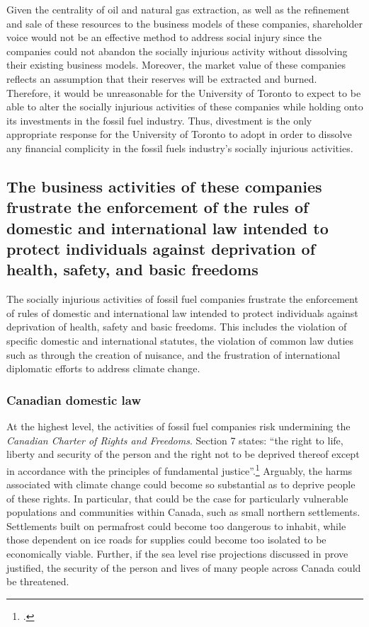 Given the centrality of oil and natural gas extraction, as well as the refinement and sale of these resources to the business models of these companies, shareholder voice would not be an effective method to address social injury since the companies could not abandon the socially injurious activity without dissolving their existing business models.  
Moreover, the market value of these companies reflects an assumption that their reserves will be extracted and burned.  
Therefore, it would be unreasonable for the University of Toronto to expect to be able to alter the socially injurious activities of these companies while holding onto its investments in the fossil fuel industry.  
Thus, divestment is the only appropriate response for the University of Toronto to adopt in order to dissolve any financial complicity in the fossil fuels industry’s socially injurious activities.  



	\subsection{The business activities of these companies frustrate the enforcement of the rules of domestic and international law intended to protect individuals against deprivation of health, safety, and basic freedoms}
	\label{sec:FrustrateLaw}



The socially injurious activities of fossil fuel companies frustrate the enforcement of rules of domestic and international law intended to protect individuals against deprivation of health, safety and basic freedoms.  
This includes the violation of specific domestic and international statutes, the violation of common law duties such as through the creation of nuisance, and the frustration of international diplomatic efforts to address climate change.



	\subsubsection{Canadian domestic law}



At the highest level, the activities of fossil fuel companies risk undermining the \emph{Canadian Charter of Rights and Freedoms}.  
Section 7 states: ``the right to life, liberty and security of the person and the right not to be deprived thereof except in accordance with the principles of fundamental justice''.\footcite[][]{CharterRF}
Arguably, the harms associated with climate change could become so substantial as to deprive people of these rights.
In particular, that could be the case for particularly vulnerable populations and communities within Canada, such as small northern settlements.
Settlements built on permafrost could become too dangerous to inhabit, while those dependent on ice roads for supplies could become too isolated to be economically viable.
Further, if the sea level rise projections discussed in  prove justified, the security of the person and lives of many people across Canada could be threatened.



